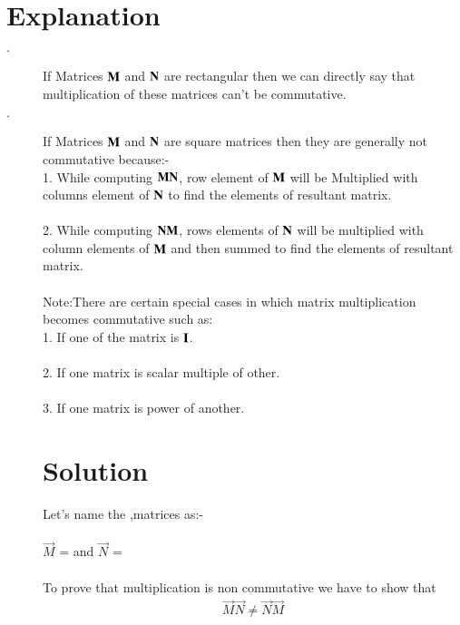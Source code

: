 \documentclass[journal,12pt,twocolumn]{IEEEtran}
\begin{document}
\section{\textbf{Explanation}}
\begin{description}
\item[$\cdot$ ]
If Matrices $\bf{M}$ and $\bf{N}$ are rectangular then we can directly say that multiplication of these matrices can't be commutative.\\
\item[$\cdot$]
If Matrices $\bf{M}$ and $\bf{N}$ are square matrices then they are generally not commutative because:-\\

1. While computing $\bf{MN}$, row element of $\bf{M}$ will be Multiplied with columns element of $\bf{N}$ to find the elements of resultant matrix.\\
\\
2. While computing $\bf{NM}$, rows elements of $\bf{N}$ will be multiplied with column elements of $\bf{M}$ and then summed to find the elements of resultant matrix.\\
\\
Note:There are certain special cases in which matrix multiplication becomes commutative such as:
\\
1. If one of the matrix is $\bf{I}$.\\
\\
2. If one matrix is scalar multiple of other.\\
\\
3. If one matrix is power of another.
\section{\textbf{Solution}}

Let's name the ,matrices as:-\\ 
\\
$\vec{M}$ =  and $\vec{N}$ = \\
\\ To prove that multiplication is non commutative we have to show that
\begin{align}
\vec{M}\vec{N} \not= \vec{N}\vec{M}
\end{align}


\end{description}
\end{document}
